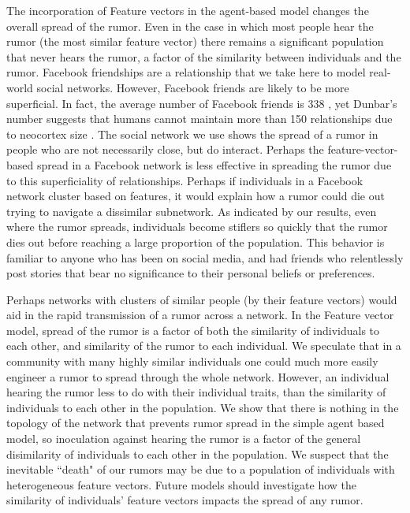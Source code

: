 The incorporation of Feature vectors in the agent-based model changes the overall spread of the rumor. Even in the case in which most people hear the rumor (the most similar feature vector) there remains a significant population that never hears the rumor, a factor of the similarity between individuals and the rumor. Facebook friendships are a relationship that we take here to model real-world social networks. However, Facebook friends are likely to be more superficial. In fact, the average number of Facebook friends is 338 \cite{smith-2014}, yet Dunbar's number suggests that humans cannot maintain more than 150 relationships due to neocortex size \cite{dunbar-1992}. The social network we use shows the spread of a rumor in people who are not necessarily close, but do interact. Perhaps the feature-vector-based spread in a Facebook network is less effective in spreading the rumor due to this superficiality of relationships. Perhaps if individuals in a Facebook network cluster based on features, it would explain how a rumor could die out trying to navigate a dissimilar subnetwork. As indicated by our results, even where the rumor spreads, individuals become stiflers so quickly that the rumor dies out before reaching a large proportion of the population. This behavior is familiar to anyone who has been on social media, and had friends who relentlessly post stories that bear no significance to their personal beliefs or preferences.

Perhaps networks with clusters of similar people (by their feature vectors) would aid in the rapid transmission of a rumor across a network. In the Feature vector model, spread of the rumor is a factor of both the similarity of individuals to each other, and similarity of the rumor to each individual. We speculate that in a community with many highly similar individuals one could much more easily engineer a rumor to spread through the whole network. However, an individual hearing the rumor less to do with their individual traits, than the similarity of individuals to each other in the population. We show that there is nothing in the topology of the network that prevents rumor spread in the simple agent based model, so inoculation against hearing the rumor is a factor of the general disimilarity of individuals to each other in the population. We suspect that the inevitable ``death" of our rumors may be due to a population of individuals with heterogeneous feature vectors. Future models should investigate how the similarity of individuals' feature vectors impacts the spread of any rumor.


